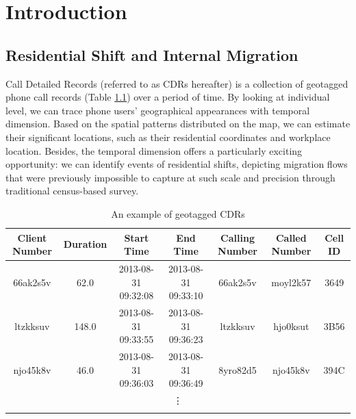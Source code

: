 \chapter{Introduction}
\section{Residential Shift and Internal Migration}
Call Detailed Records (referred to as CDRs hereafter) is a collection of geotagged phone call records (Table \ref{tab:example_cdr}) over a period of time. By looking at individual level, we can trace phone users' geographical appearances with temporal dimension. Based on the spatial patterns distributed on the map, we can estimate their significant locations, such as their residential coordinates and workplace location. Besides, the temporal dimension offers a particularly exciting opportunity: we can identify events of residential shifts, depicting migration flows that were previously impossible to capture at such scale and precision through traditional census-based survey.

\begin{table}[htbp]
\vspace{0.3cm}
\renewcommand{\arraystretch}{1.6}
\setlength{\tabcolsep}{1.9mm}{}
\centering
\scriptsize
\caption{An example of geotagged CDRs}

\begin{tabular}{ccccccc}
\hline

\textbf{Client Number} & \textbf{Duration} & \textbf{Start Time} & \textbf{End Time} & \textbf{Calling Number} & \textbf{Called Number} & \textbf{Cell ID} \\ \hline

66ak2s5v & 62.0 & 2013-08-31 09:32:08 & 2013-08-31 09:33:10 & 66ak2s5v & moyl2k57 & 3649 \\

ltzkksuv & 148.0 & 2013-08-31 09:33:55 & 2013-08-31 09:36:23 & ltzkksuv & hjo0ksut & 3B56 \\

njo45k8v & 46.0 & 2013-08-31 09:36:03 & 2013-08-31 09:36:49 & 8yro82d5 & njo45k8v & 394C \\

\multicolumn{7}{c}{\vdots} \\
\hline
\label{tab:cdr}%
\end{tabular}%

\label{tab:example_cdr}
\end{table}

